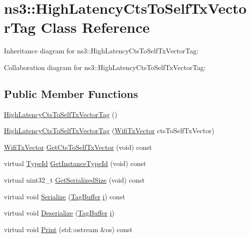\hypertarget{classns3_1_1HighLatencyCtsToSelfTxVectorTag}{}\section{ns3\+:\+:High\+Latency\+Cts\+To\+Self\+Tx\+Vector\+Tag Class Reference}
\label{classns3_1_1HighLatencyCtsToSelfTxVectorTag}


Inheritance diagram for ns3\+:\+:High\+Latency\+Cts\+To\+Self\+Tx\+Vector\+Tag\+:


Collaboration diagram for ns3\+:\+:High\+Latency\+Cts\+To\+Self\+Tx\+Vector\+Tag\+:
\subsection*{Public Member Functions}
\begin{DoxyCompactItemize}
\item 
\hyperlink{classns3_1_1HighLatencyCtsToSelfTxVectorTag_a0dd62698c36cb036c793f491e4e67e93}{High\+Latency\+Cts\+To\+Self\+Tx\+Vector\+Tag} ()
\item 
\hyperlink{classns3_1_1HighLatencyCtsToSelfTxVectorTag_a2e7bef7cc2bb4d1b50d09561f9cc721f}{High\+Latency\+Cts\+To\+Self\+Tx\+Vector\+Tag} (\hyperlink{classns3_1_1WifiTxVector}{Wifi\+Tx\+Vector} cts\+To\+Self\+Tx\+Vector)
\item 
\hyperlink{classns3_1_1WifiTxVector}{Wifi\+Tx\+Vector} \hyperlink{classns3_1_1HighLatencyCtsToSelfTxVectorTag_a7554ee51d13c1f6f5a53e42d27fc2bfa}{Get\+Cts\+To\+Self\+Tx\+Vector} (void) const 
\item 
virtual \hyperlink{classns3_1_1TypeId}{Type\+Id} \hyperlink{classns3_1_1HighLatencyCtsToSelfTxVectorTag_a7b34c90d6bbe9e0d0d6ef9f16d145727}{Get\+Instance\+Type\+Id} (void) const 
\item 
virtual uint32\+\_\+t \hyperlink{classns3_1_1HighLatencyCtsToSelfTxVectorTag_ae6af6a7700427c56f0ad6faeaff94aba}{Get\+Serialized\+Size} (void) const 
\item 
virtual void \hyperlink{classns3_1_1HighLatencyCtsToSelfTxVectorTag_a9e7837c1ddfe5dfa172d83b3b5c73fab}{Serialize} (\hyperlink{classns3_1_1TagBuffer}{Tag\+Buffer} \hyperlink{lte__uplink__power__control_8m_a6f6ccfcf58b31cb6412107d9d5281426}{i}) const 
\item 
virtual void \hyperlink{classns3_1_1HighLatencyCtsToSelfTxVectorTag_ac1bef898136527573fb83ea7a2b37333}{Deserialize} (\hyperlink{classns3_1_1TagBuffer}{Tag\+Buffer} \hyperlink{lte__uplink__power__control_8m_a6f6ccfcf58b31cb6412107d9d5281426}{i})
\item 
virtual void \hyperlink{classns3_1_1HighLatencyCtsToSelfTxVectorTag_a5bcfe2f272c7846d1f2c6f841870038f}{Print} (std\+::ostream \&os) const 
\end{DoxyCompactItemize}
